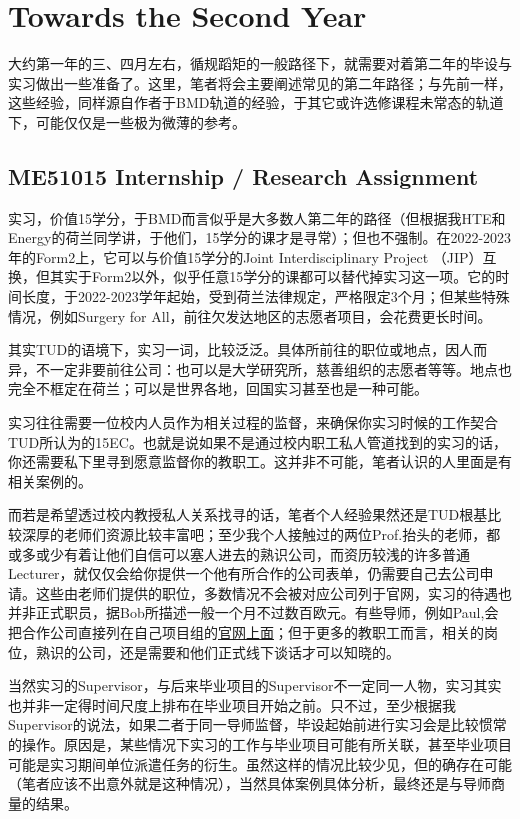 \vspace{\betsubsec} %
\section{Towards the Second Year}

大约第一年的三、四月左右，循规蹈矩的一般路径下，就需要对着第二年的毕设与实习做出一些准备了。这里，笔者将会主要阐述常见的第二年路径；与先前一样，这些经验，同样源自作者于BMD轨道的经验，于其它或许选修课程未常态的轨道下，可能仅仅是一些极为微薄的参考。

\subsection{ME51015 Internship / Research Assignment}
实习，价值15学分，于BMD而言似乎是大多数人第二年的路径（但根据我HTE和Energy的荷兰同学讲，于他们，15学分的课才是寻常）；但也不强制。在2022-2023年的Form2上，它可以与价值15学分的Joint Interdisciplinary Project （JIP）互换，但其实于Form2以外，似乎任意15学分的课都可以替代掉实习这一项。它的时间长度，于2022-2023学年起始，受到荷兰法律规定，严格限定3个月；但某些特殊情况，例如Surgery for All，前往欠发达地区的志愿者项目，会花费更长时间。

其实TUD的语境下，实习一词，比较泛泛。具体所前往的职位或地点，因人而异，不一定非要前往公司：也可以是大学研究所，慈善组织的志愿者等等。地点也完全不框定在荷兰；可以是世界各地，回国实习甚至也是一种可能。

实习往往需要一位校内人员作为相关过程的监督，来确保你实习时候的工作契合TUD所认为的15EC。也就是说如果不是通过校内职工私人管道找到的实习的话，你还需要私下里寻到愿意监督你的教职工。这并非不可能，笔者认识的人里面是有相关案例的。

而若是希望透过校内教授私人关系找寻的话，笔者个人经验果然还是TUD根基比较深厚的老师们资源比较丰富吧；至少我个人接触过的两位Prof.抬头的老师，都或多或少有着让他们自信可以塞人进去的熟识公司，而资历较浅的许多普通Lecturer，就仅仅会给你提供一个他有所合作的公司表单，仍需要自己去公司申请。这些由老师们提供的职位，多数情况不会被对应公司列于官网，实习的待遇也并非正式职员，据Bob所描述一般一个月不过数百欧元。有些导师，例如Paul,会把合作公司直接列在自己项目组的\href{https://www.bitegroup.nl/internships/}{\uline{官网上面}}；但于更多的教职工而言，相关的岗位，熟识的公司，还是需要和他们正式线下谈话才可以知晓的。

当然实习的Supervisor，与后来毕业项目的Supervisor不一定同一人物，实习其实也并非一定得时间尺度上排布在毕业项目开始之前。只不过，至少根据我Supervisor的说法，如果二者于同一导师监督，毕设起始前进行实习会是比较惯常的操作。原因是，某些情况下实习的工作与毕业项目可能有所关联，甚至毕业项目可能是实习期间单位派遣任务的衍生。虽然这样的情况比较少见，但的确存在可能（笔者应该不出意外就是这种情况），当然具体案例具体分析，最终还是与导师商量的结果。

